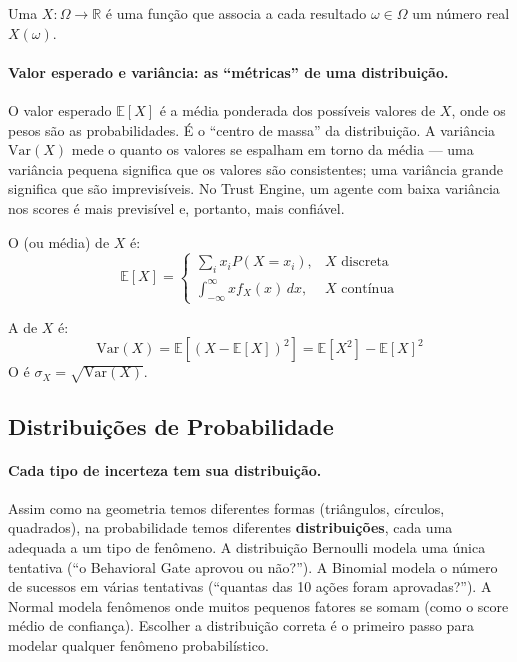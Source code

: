 \begin{definicao}
    Uma  $X: \Omega \to \mathbb{R}$ é uma
    função que associa a cada resultado $\omega \in \Omega$ um número real
    $X(\omega)$.
\end{definicao}

\paragraph{Valor esperado e variância: as ``métricas'' de uma distribuição.}
O valor esperado $\mathbb{E}[X]$ é a média ponderada dos possíveis valores
de $X$, onde os pesos são as probabilidades. É o ``centro de massa'' da
distribuição. A variância $\text{Var}(X)$ mede o quanto os valores se
espalham em torno da média --- uma variância pequena significa que os valores
são consistentes; uma variância grande significa que são imprevisíveis. No
Trust Engine, um agente com baixa variância nos scores é mais previsível e,
portanto, mais confiável.

\begin{definicao}
    O  (ou média) de $X$ é:
    \[
    \mathbb{E}[X] = \begin{cases}
        \sum_i x_i P(X = x_i), & X \text{ discreta} \\[4pt]
        \int_{-\infty}^{\infty} x f_X(x) \, dx, & X \text{ contínua}
    \end{cases}
    \]
\end{definicao}

\begin{definicao}[Variância]
    A  de $X$ é:
    \[
    \text{Var}(X) = \mathbb{E}[(X - \mathbb{E}[X])^2] =
    \mathbb{E}[X^2] - \mathbb{E}[X]^2
    \]
    O  é $\sigma_X = \sqrt{\text{Var}(X)}$.
\end{definicao}

\subsection{Distribuições de Probabilidade}

\paragraph{Cada tipo de incerteza tem sua distribuição.} Assim como na
geometria temos diferentes formas (triângulos, círculos, quadrados), na
probabilidade temos diferentes \textbf{distribuições}, cada uma adequada a
um tipo de fenômeno. A distribuição Bernoulli modela uma única tentativa
(``o Behavioral Gate aprovou ou não?''). A Binomial modela o número de
sucessos em várias tentativas (``quantas das 10 ações foram aprovadas?'').
A Normal modela fenômenos onde muitos pequenos fatores se somam (como o
score médio de confiança). Escolher a distribuição correta é o primeiro
passo para modelar qualquer fenômeno probabilístico.

